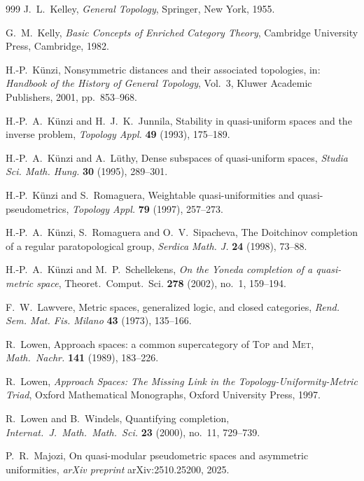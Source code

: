 \documentclass[preprint,12pt]{elsarticle}
\begin{document}
\begin{thebibliography}{999}
J.~L.~Kelley,
\emph{General Topology},
Springer, New York, 1955.

G.~M.~Kelly,
\emph{Basic Concepts of Enriched Category Theory},
Cambridge University Press, Cambridge, 1982.

H.-P.~K\"unzi,
Nonsymmetric distances and their associated topologies,
in: \emph{Handbook of the History of General Topology}, Vol.~3,
Kluwer Academic Publishers, 2001, pp.~853--968.

H.-P.~A.~K\"unzi and H.~J.~K.~Junnila,
Stability in quasi-uniform spaces and the inverse problem,
\emph{Topology Appl.} \textbf{49} (1993), 175--189.

H.-P.~A.~K\"unzi and A.~L{\"u}thy,
Dense subspaces of quasi-uniform spaces,
\emph{Studia Sci. Math. Hung.} \textbf{30} (1995), 289--301.

H.-P.~K\"unzi and S.~Romaguera,
Weightable quasi-uniformities and quasi-pseudometrics,
\emph{Topology Appl.} \textbf{79} (1997), 257--273.

H.-P.~A.~K\"unzi, S.~Romaguera and O.~V.~Sipacheva,
The Doitchinov completion of a regular paratopological group,
\emph{Serdica Math. J.} \textbf{24} (1998), 73--88.

H.-P.~A.~K\"unzi and M.~P.~Schellekens,
\emph{On the Yoneda completion of a quasi-metric space},
Theoret.\ Comput.\ Sci. \textbf{278} (2002), no.~1, 159--194.

F.~W.~Lawvere,
Metric spaces, generalized logic, and closed categories,
\emph{Rend. Sem. Mat. Fis. Milano} \textbf{43} (1973), 135--166.

R.~Lowen,
Approach spaces: a common supercategory of \textsc{Top} and \textsc{Met},
\emph{Math.\ Nachr.} \textbf{141} (1989), 183--226.

R.~Lowen,
\emph{Approach Spaces: The Missing Link in the Topology-Uniformity-Metric Triad},
Oxford Mathematical Monographs, Oxford University Press, 1997.

R.~Lowen and B.~Windels,
Quantifying completion,
\emph{Internat.\ J.\ Math.\ Math.\ Sci.} \textbf{23} (2000), no.~11, 729--739.

P.~R.~Majozi,
On quasi-modular pseudometric spaces and asymmetric uniformities,
\emph{arXiv preprint} arXiv:2510.25200, 2025.


\end{thebibliography}
\end{document}
